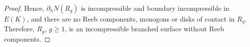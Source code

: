 \documentclass[10pt,a4paper]{amsart}
\begin{document}
\begin{proof}
Hence, $\partial_h N(R_g)$ is incompressible and boundary incompressible in $E(K)$, and there are no Reeb components,  monogons or disks of contact  in $R_g$.  Therefore, $R_g$,  $g\geq 1$, is an incompressible branched surface without Reeb components.
\end{proof}
\end{document}
